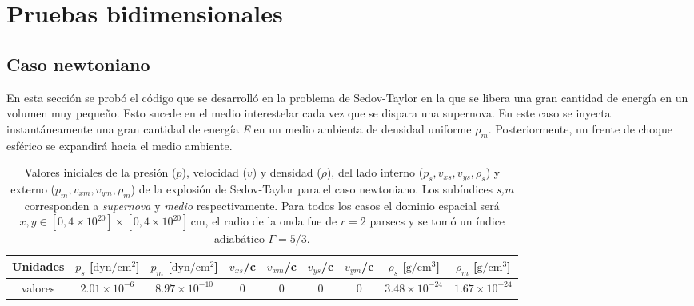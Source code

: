 \documentclass[12pt,a4paper]{book}
\begin{document}


\section{Pruebas bidimensionales}

\subsection{Caso newtoniano}

En esta sección se probó el código que se desarrolló en la problema de Sedov-Taylor en la que se libera una gran cantidad de energía en un volumen muy pequeño. 
Esto sucede en el medio interestelar cada vez que se dispara una supernova. 
En este caso se inyecta instantáneamente una gran cantidad de energía \emph{E} en un medio ambienta de densidad uniforme $\rho_m$. 
Posteriormente,  un frente de choque esférico se expandirá hacia el medio ambiente.

\begin{table}[htbp]
  \begin{center}
  \begin{tabular}{|c|c|c|c|c|c|c|c|c|}
  \hline 
  \textbf{Unidades} & \textbf{$p_s$} [$\text{dyn}/\text{cm}^2$] & 
  \textbf{$p_m$} [$\text{dyn}/\text{cm}^2$] & 
  \textbf{$v_{xs}$}/c & \textbf{$v_{xm}$}/c  & \textbf{$v_{ys}$}/c & \textbf{$v_{ym}$}/c  & 
  \textbf{$\rho_s$} [$\text{g}/\text{cm}^3$]& 
  \textbf{$\rho_m$} [$\text{g}/\text{cm}^3$]\\ 
  \hline 
  valores & $2.01 \times 10^{-6}$ & $8.97 \times 10^{-10}$  & 0 & 0 & 0 & 0 &  $3.48 \times 10^{-24}$  & $1.67 \times 10^{-24}$ \\ 
  \hline 
  \end{tabular}
  \caption{\label{Cuadro_parametros_choque_2D_newtoniano} Valores iniciales 
  de la presión ($p$), velocidad ($v$)
  y densidad ($\rho$), del lado interno ($p_s, v_{xs}, v_{ys}, \rho_s$) y 
  externo ($p_m, v_{xm}, v_{ym}, \rho_m$) de la explosión de Sedov-Taylor
  para el caso newtoniano. Los subíndices \emph{s,m} corresponden a \emph{supernova} y \emph{medio} respectivamente. Para todos los
  casos el dominio espacial será $x, y \in [0,4 \times 10^{20}]\times[0,4 \times 10^{20}] \, \text{cm}$, el radio de la onda
  fue de $r = 2$ parsecs y se tomó un índice adiabático $\Gamma = 5/3$.}
  \end{center}
\end{table}
\end{document}
